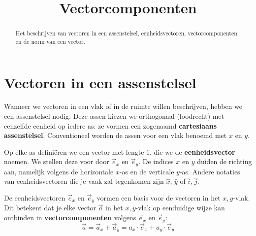 \documentclass{ximera}
\title{Vectorcomponenten}
\begin{document}
\begin{abstract}
    Het beschrijven van vectoren in een assenstelsel, eenheidsvectoren, vectorcomponenten en de norm van een vector.
\end{abstract}
\maketitle

\section{Vectoren in een assenstelsel}

Wanneer we vectoren in een vlak of in de ruimte willen beschrijven, hebben we een assenstelsel nodig. Deze assen kiezen we orthogonaal (loodrecht) met eenzelfde eenheid op iedere as: ze vormen een zogenaamd \textbf{cartesiaans assenstelsel}. Conventioneel worden de assen voor een vlak benoemd met $x$ en $y$. 

Op elke as definiëren we een vector met lengte $1$, die we de \textbf{eenheidsvector} noemen. We stellen deze voor door $\vec{e}_{x}$ en $\vec{e}_{y}$. De indices $x$ en $y$ duiden de richting aan, namelijk volgens de horizontale $x$-as en de verticale $y$-as. Andere notaties van eenheidsvectoren die je vaak zal tegenkomen zijn $\hat{x}$, $\hat{y}$ of $\hat{i}$, $\hat{j}$.

De eenheidsvectoren $\vec{e}_{x}$ en $\vec{e}_{y}$ vormen een basis voor de vectoren in het $x,y$-vlak. Dit betekent dat je elke vector $\vec{a}$ in het $x,y$-vlak op eenduidige wijze kan ontbinden in \textbf{vectorcomponenten} volgens $\vec{e}_{x}$ en $\vec{e}_{y}$:
\[ \vec{a} = \vec{a}_{x} + \vec{a}_{y} = a_{x} \cdot \vec{e}_{x} + a_{y} \cdot \vec{e}_{y} \] 
\end{document}
